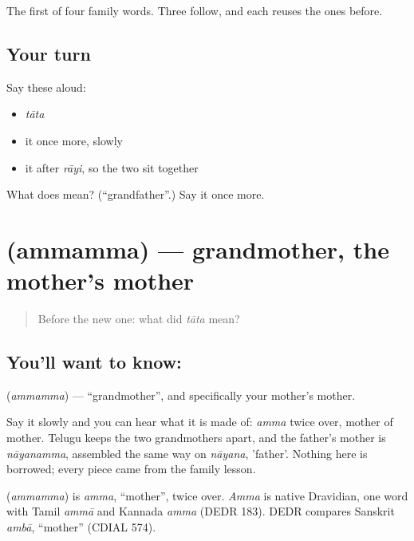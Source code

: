 \begin{grammarlens}[title={What you've built}]
The first of four family words. Three follow, and each reuses the ones before.
\end{grammarlens}

\subsection*{Your turn}
Say these aloud:

\begin{itemize}
\raggedright
  \item \emph{tāta}
  \item it once more, slowly
  \item it after \emph{rāyi}, so the two sit together
\end{itemize}

\begin{tcolorbox}[breakable,colback=teal!4,colframe=teal!35!black,title={Before you move on}]
What does  mean? (\textquotedblleft{}grandfather\textquotedblright{}.) Say it once more.
\end{tcolorbox}
\section[\texorpdfstring{\te{అమ్మమ్మ} (ammamma)}{అమ్మమ్మ (ammamma)}]{ (ammamma) — grandmother, the mother's mother}

\label{lesson:TE-C45-grandmother}



\begin{quote}
Before the new one: what did \emph{tāta} mean?
\end{quote}

\subsection*{You'll want to know: }
\textbf{} (\emph{ammamma}) — \textquotedblleft{}grandmother\textquotedblright{}, and specifically your mother's mother.

Say it slowly and you can hear what it is made of: \emph{amma} twice over, mother of mother. Telugu keeps the two grandmothers apart, and the father's mother is \emph{nāyanamma}, assembled the same way on \emph{nāyana}, 'father'. Nothing here is borrowed; every piece came from the family lesson.

\begin{cousinweb}
\textbf{} (\emph{ammamma}) is \emph{amma}, \textquotedblleft{}mother\textquotedblright{}, twice over. \emph{Amma} is native Dravidian, one word with Tamil \emph{ammā} and Kannada \emph{amma} (DEDR 183). DEDR compares Sanskrit \emph{ambā}, \textquotedblleft{}mother\textquotedblright{} (CDIAL 574).
\end{cousinweb}

